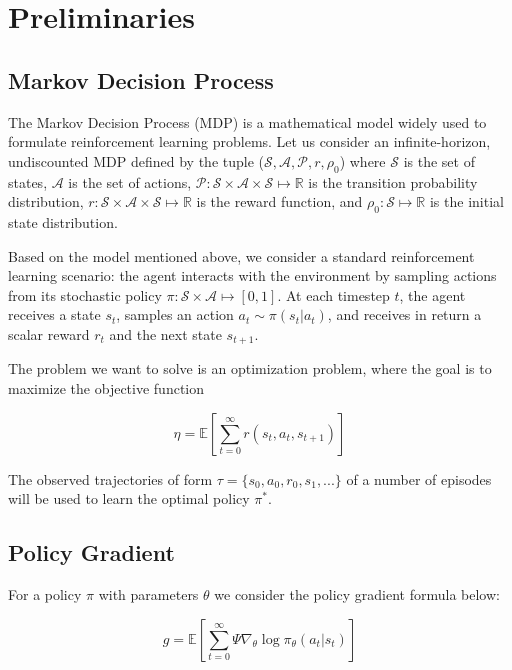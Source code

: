 \section{Preliminaries}
\label{sec:preleminaries}


\subsection{Markov Decision Process}
The Markov Decision Process (MDP) is a mathematical model widely used to formulate reinforcement learning problems. Let us consider an infinite-horizon, undiscounted MDP defined by the tuple ($\mathcal{S}, \mathcal{A}, \mathcal{P}, r, \rho_0$) where $\mathcal{S}$ is the set of states, $\mathcal{A}$ is the set of actions, $\mathcal{P}: \mathcal{S}\times\mathcal{A}\times\mathcal{S}\mapsto \mathbb{R}$ is the transition probability distribution, $r: \mathcal{S}\times\mathcal{A}\times\mathcal{S} \mapsto \mathbb{R}$ is the reward function, and $\rho_0:\mathcal{S}\mapsto\mathbb{R}$ is the initial state distribution.

Based on the model mentioned above, we consider a standard reinforcement learning scenario: the agent interacts with the environment by sampling actions from its stochastic policy $\pi:\mathcal{S}\times\mathcal{A}\mapsto[0,1]$. At each timestep $t$, the agent receives a state $s_t$, samples an action $a_t \sim \pi(s_t | a_t)$, and receives in return a scalar reward $r_t$ and the next state $s_{t+1}$. 

The problem we want to solve is an optimization problem, where the goal is to maximize the objective function 

\[
\eta = \mathbb{E}
\left[ \sum_{t=0}^{\infty}r(s_t, a_t, s_{t+1})\right]
\] 

The observed trajectories of form $\tau = \{s_0, a_0, r_0, s_1, ... \}$ of a number of episodes will be used to learn the optimal policy $\pi^*$. 


\subsection{Policy Gradient}
For a policy $\pi$ with parameters $\theta$ we consider the policy gradient formula below:

\[
g = \mathbb{E}\left[\sum_{t=0}^{\infty} \Psi \nabla_{\theta}\log\pi_{\theta}(a_t|s_t)\right]
\]

